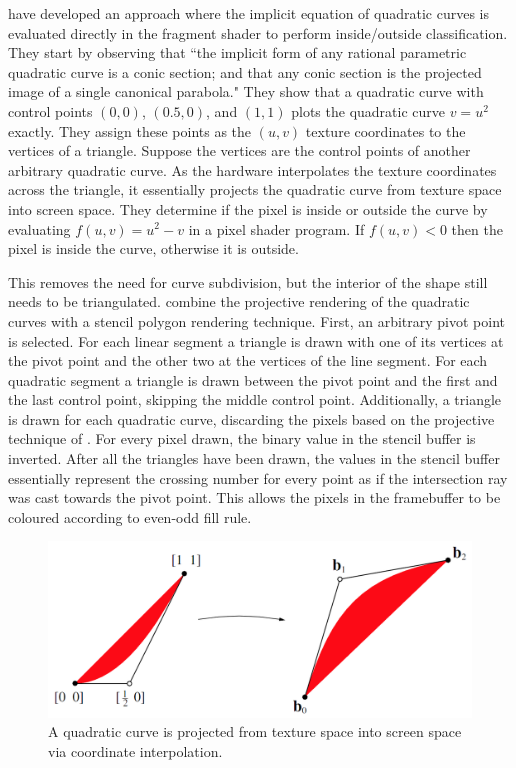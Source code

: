 \documentclass[11pt,a4paper,twoside]{article}
\begin{document}
\cite{LoopBlinn05} have developed an approach where the implicit equation of quadratic curves is evaluated directly in the fragment shader to perform inside/outside classification. They start by observing that ``the implicit form of any rational parametric quadratic curve is a conic section; and that any conic section is the projected image of a single canonical parabola." They show that a quadratic curve with control points $(0,0)$, $(0.5,0)$, and $(1,1)$ plots the quadratic curve $v = u^2$ exactly. They assign these points as the $(u,v)$ texture coordinates to the vertices of a triangle. Suppose the vertices are the control points of another arbitrary quadratic curve. As the hardware interpolates the texture coordinates across the triangle, it essentially projects the quadratic curve from texture space into screen space. They determine if the pixel is inside or outside the curve by evaluating $f(u,v) = u^2 - v$ in a pixel shader program. If $f(u,v) < 0$ then the pixel is inside the curve, otherwise it is outside.

This removes the need for curve subdivision, but the interior of the shape still needs to be triangulated. \cite{Kokojima06} combine the projective rendering of the quadratic curves with a stencil polygon rendering technique. First, an arbitrary pivot point is selected. For each linear segment a triangle is drawn with one of its vertices at the pivot point and the other two at the vertices of the line segment. For each quadratic segment a triangle is drawn between the pivot point and the first and the last control point, skipping the middle control point. Additionally, a triangle is drawn for each quadratic curve, discarding the pixels based on the projective technique of \cite{LoopBlinn05}. For every pixel drawn, the binary value in the stencil buffer is inverted. After all the triangles have been drawn, the values in the stencil buffer essentially represent the crossing number for every point as if the intersection ray was cast towards the pivot point. This allows the pixels in the framebuffer to be coloured according to even-odd fill rule.

\begin {figure}
	\centering
	\includegraphics [width=0.5\columnwidth] {figures/loop_blinn}
	\caption {A quadratic curve is projected from texture space into screen space via coordinate interpolation.}
	\label {fig:loop_blinn}
\end {figure}
\end{document}
